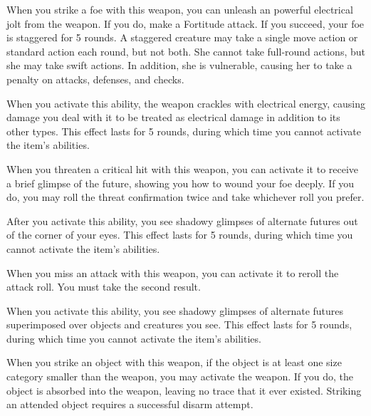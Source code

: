 
 When you strike a foe with this weapon, you can unleash an powerful electrical jolt from the weapon.
If you do, make a Fortitude attack.
If you succeed, your foe is staggered for 5 rounds.
A staggered creature may take a single move action or standard action each round, but not both.
She cannot take full-round actions, but she may take swift actions.
In addition, she is vulnerable, causing her to take a  penalty on attacks, defenses, and checks.

When you activate this ability, the weapon crackles with electrical energy, causing damage you deal with it to be treated as electrical damage in addition to its other types.
This effect lasts for 5 rounds, during which time you cannot activate the item's abilities.


 When you threaten a critical hit with this weapon, you can activate it to receive a brief glimpse of the future, showing you how to wound your foe deeply.
If you do, you may roll the threat confirmation twice and take whichever roll you prefer.

After you activate this ability, you see shadowy glimpses of alternate futures out of the corner of your eyes.
This effect lasts for 5 rounds, during which time you cannot activate the item's abilities.


 When you miss an attack with this weapon, you can activate it to reroll the attack roll.
You must take the second result.

When you activate this ability, you see shadowy glimpses of alternate futures superimposed over objects and creatures you see.
This effect lasts for 5 rounds, during which time you cannot activate the item's abilities.


 When you strike an object with this weapon, if the object is at least one size category smaller than the weapon, you may activate the weapon.
If you do, the object is absorbed into the weapon, leaving no trace that it ever existed.
Striking an attended object requires a successful disarm attempt.

